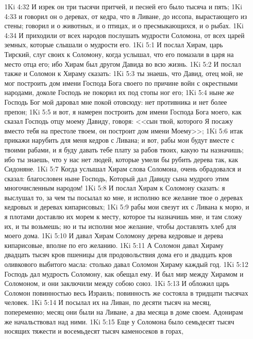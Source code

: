 \vs 1Ki 4:32 И изрек он три тысячи притчей, и песней его было тысяча и пять;
\vs 1Ki 4:33 и говорил он о деревах, от кедра, что в Ливане, до иссопа, вырастающего из стены; говорил и о животных, и о птицах, и о пресмыкающихся, и о рыбах.
\vs 1Ki 4:34 И приходили от всех народов послушать мудрости Соломона, от всех царей земных, которые слышали о мудрости его.
\vs 1Ki 5:1 И послал Хирам, царь Тирский, слуг своих к Соломону, когда услышал, что его помазали в царя на место отца его; ибо Хирам был другом Давида во всю жизнь.
\vs 1Ki 5:2 И послал также и Соломон к Хираму сказать:
\vs 1Ki 5:3 ты знаешь, что Давид, отец мой, не мог построить дом имени Господа Бога своего по причине войн с окрестными народами, доколе Господь не покорил их под стопы ног его;
\vs 1Ki 5:4 ныне же Господь Бог мой даровал мне покой отовсюду: нет противника и нет более препон;
\vs 1Ki 5:5 и вот, я намерен построить дом имени Господа Бога моего, как сказал Господь отцу моему Давиду, говоря: <<сын твой, которого Я посажу вместо тебя на престоле твоем, он построит дом имени Моему>>;
\vs 1Ki 5:6 итак прикажи нарубить для меня кедров с Ливана; и вот, рабы мои будут вместе с твоими рабами, и я буду давать тебе плату за рабов твоих, какую ты назначишь; ибо ты знаешь, что у нас нет людей, которые умели бы рубить дерева так, как Сидоняне.
\vs 1Ki 5:7 Когда услышал Хирам слова Соломона, очень обрадовался и сказал: благословен ныне Господь, Который дал Давиду сына мудрого  этим многочисленным народом!
\vs 1Ki 5:8 И послал Хирам к Соломону сказать: я выслушал то, за чем ты посылал ко мне, и исполню все желание твое о деревах кедровых и деревах кипарисовых;
\vs 1Ki 5:9 рабы мои свезут их с Ливана к морю, и я плотами доставлю их морем к месту, которое ты назначишь мне, и там сложу их, и ты возьмешь; но и ты исполни мое желание, чтобы доставлять хлеб для моего дома.
\vs 1Ki 5:10 И давал Хирам Соломону дерева кедровые и дерева кипарисовые, вполне по его желанию.
\vs 1Ki 5:11 А Соломон давал Хираму двадцать тысяч кров пшеницы для продовольствия дома его и двадцать кров оливкового выбитого масла: столько давал Соломон Хираму каждый год.
\rsbpar\vs 1Ki 5:12 Господь дал мудрость Соломону, как обещал ему. И был мир между Хирамом и Соломоном, и они заключили между собою союз.
\vs 1Ki 5:13 И обложил царь Соломон повинностью весь Израиль; повинность же состояла в тридцати тысячах человек.
\vs 1Ki 5:14 И посылал их на Ливан, по десяти тысяч на месяц, попеременно; месяц они были на Ливане, а два месяца в доме своем. Адонирам же начальствовал над ними.
\vs 1Ki 5:15 Еще у Соломона было семьдесят тысяч носящих тяжести и восемьдесят тысяч каменосеков в горах,
